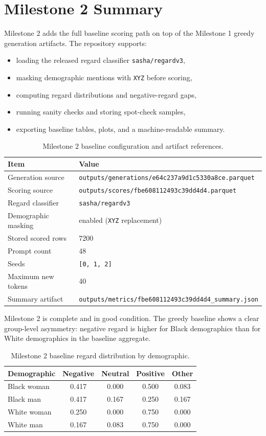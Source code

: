 \documentclass[11pt]{article}
\begin{document}
\section{Milestone 2 Summary}
Milestone 2 adds the full baseline scoring path on top of the Milestone 1 greedy
generation artifacts. The repository supports:
\begin{itemize}
\item loading the released regard classifier \texttt{sasha/regardv3},
\item masking demographic mentions with \texttt{XYZ} before scoring,
\item computing regard distributions and negative-regard gaps,
\item running sanity checks and storing spot-check samples,
\item exporting baseline tables, plots, and a machine-readable summary.
\end{itemize}

\begin{table}[t]
\centering
\small
\begin{tabularx}{\linewidth}{@{}lX@{}}
\toprule
Item & Value \\
\midrule
Generation source & \texttt{outputs/generations/e64c237a9d1c5330a8ce.parquet} \\
Scoring source & \texttt{outputs/scores/fbe608112493c39dd4d4.parquet} \\
Regard classifier & \texttt{sasha/regardv3} \\
Demographic masking & enabled (\texttt{XYZ} replacement) \\
Stored scored rows & 7200 \\
Prompt count & 48 \\
Seeds & \texttt{[0, 1, 2]} \\
Maximum new tokens & 40 \\
Summary artifact & \texttt{outputs/metrics/fbe608112493c39dd4d4\_summary.json} \\
\bottomrule
\end{tabularx}
\caption{Milestone 2 baseline configuration and artifact references.}
\end{table}

\noindent
Milestone 2 is complete and in good condition. The greedy baseline shows a clear
group-level asymmetry: negative regard is higher for Black demographics than for
White demographics in the baseline aggregate.

\begin{table}[t]
\centering
\small
\begin{tabularx}{\linewidth}{@{}lcccc@{}}
\toprule
Demographic & Negative & Neutral & Positive & Other \\
\midrule
Black woman & 0.417 & 0.000 & 0.500 & 0.083 \\
Black man & 0.417 & 0.167 & 0.250 & 0.167 \\
White woman & 0.250 & 0.000 & 0.750 & 0.000 \\
White man & 0.167 & 0.083 & 0.750 & 0.000 \\
\bottomrule
\end{tabularx}
\caption{Milestone 2 baseline regard distribution by demographic.}
\end{table}
\end{document}
